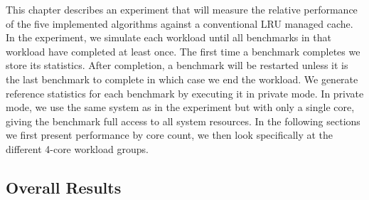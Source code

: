This chapter describes an experiment that will measure the relative performance of the five implemented algorithms against a conventional LRU managed cache.
In the experiment, we simulate each workload until all benchmarks in that workload have completed at least once. 
The first time a benchmark completes we store its statistics.
After completion, a benchmark will be restarted unless it is the last benchmark to complete in which case we end the workload.
We generate reference statistics for each benchmark by executing it in private mode.
In private mode, we use the same system as in the experiment but with only a single core, giving the benchmark full access to all system resources.
In the following sections we first present performance by core count, we then look specifically at the different 4-core workload groups.

\subsection{Overall Results}
\label{sec:results:cache_partition}


